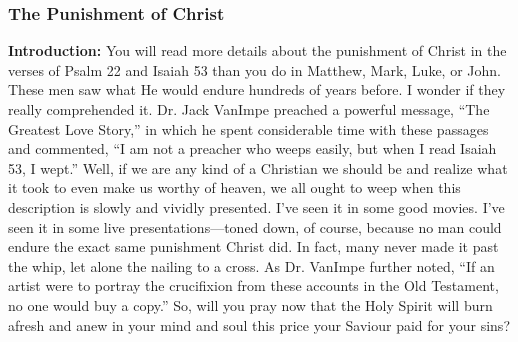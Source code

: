 \subsubsection{The Punishment of Christ}

\textbf{Introduction: } You will read more details about the punishment of Christ in the verses of Psalm 22 and Isaiah 53 than you do in Matthew, Mark, Luke, or John.  These men saw what He would endure hundreds of years before.  I wonder if they really comprehended it.  Dr. Jack VanImpe preached a powerful message, “The Greatest Love Story,” in which he spent considerable time with these passages and commented, “I am not a preacher who weeps easily, but when I read Isaiah 53, I wept.”  Well, if we are any kind of a Christian we should be and realize what it took to even make us worthy of heaven, we all ought to weep when this description is slowly and vividly presented.  I’ve seen it in some good movies.  I’ve seen it in some live presentations—toned down, of course, because no man could endure the exact same punishment Christ did.  In fact, many never made it past the whip, let alone the nailing to a cross.  As Dr. VanImpe further noted, “If an artist were to portray the crucifixion from these accounts in the Old Testament, no one would buy a copy.”  So, will you pray now that the Holy Spirit will burn afresh and anew in your mind and soul this price your Saviour paid for your sins?

